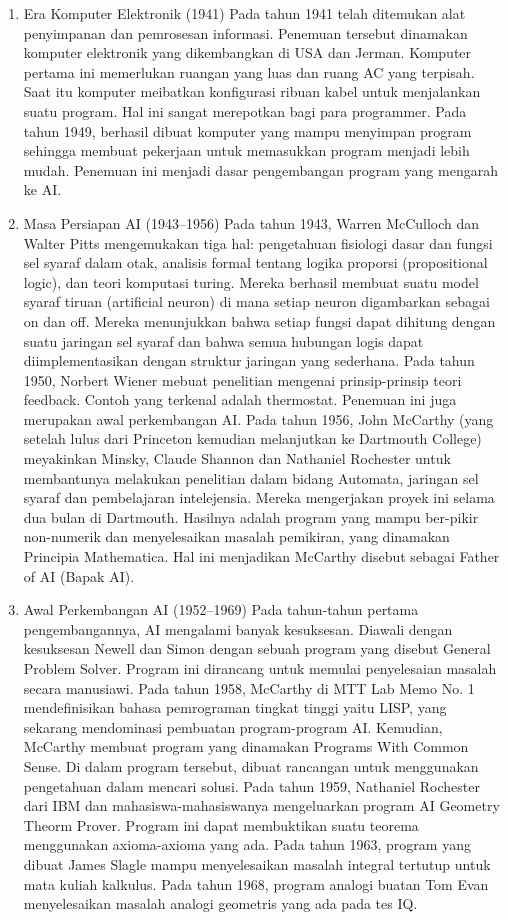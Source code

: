 \documentclass{article}
\begin{document}
\begin{enumerate}
	\item Era Komputer Elektronik (1941)
	\hfill\break
	Pada tahun 1941 telah ditemukan alat penyimpanan dan pemrosesan informasi. Penemuan tersebut dinamakan komputer elektronik yang dikembangkan di USA dan Jerman. Komputer pertama ini memerlukan ruangan yang luas dan ruang AC yang terpisah. Saat itu komputer meibatkan konfigurasi ribuan kabel untuk menjalankan suatu program. Hal ini sangat merepotkan bagi para programmer. Pada tahun 1949, berhasil dibuat komputer yang mampu menyimpan program sehingga membuat pekerjaan untuk memasukkan program menjadi lebih mudah. Penemuan ini menjadi dasar pengembangan program yang mengarah ke AI.

	\item Masa Persiapan AI (1943–1956)
	\hfill\break
	Pada tahun 1943, Warren McCulloch dan Walter Pitts mengemukakan tiga hal: pengetahuan fisiologi dasar dan fungsi sel syaraf dalam otak, analisis formal tentang logika proporsi (propositional logic), dan teori komputasi turing. Mereka berhasil membuat suatu model syaraf tiruan (artificial neuron) di mana setiap neuron digambarkan sebagai on dan off. Mereka menunjukkan bahwa setiap fungsi dapat dihitung dengan suatu jaringan sel syaraf dan bahwa semua hubungan logis dapat diimplementasikan dengan struktur jaringan yang sederhana.
	\noindent
	Pada tahun 1950, Norbert Wiener mebuat penelitian mengenai prinsip-prinsip teori feedback. Contoh yang terkenal adalah thermostat. Penemuan ini juga merupakan awal perkembangan AI. Pada tahun 1956, John McCarthy (yang setelah lulus dari Princeton kemudian melanjutkan ke Dartmouth College) meyakinkan Minsky, Claude Shannon dan Nathaniel Rochester untuk membantunya melakukan penelitian dalam bidang Automata, jaringan sel syaraf dan pembelajaran intelejensia. Mereka mengerjakan proyek ini selama dua bulan di Dartmouth. Hasilnya adalah program yang mampu ber-pikir non-numerik dan menyelesaikan masalah pemikiran, yang dinamakan Principia Mathematica. Hal ini menjadikan McCarthy disebut sebagai Father of AI (Bapak AI).

	\item Awal Perkembangan AI (1952–1969)
	\hfill\break
	Pada tahun-tahun pertama pengembangannya, AI mengalami banyak kesuksesan. Diawali dengan kesuksesan Newell dan Simon dengan sebuah program yang disebut General Problem Solver. Program ini dirancang untuk memulai penyelesaian masalah secara manusiawi. Pada tahun 1958, McCarthy di MTT Lab Memo No. 1 mendefinisikan bahasa pemrograman tingkat tinggi yaitu LISP, yang sekarang mendominasi pembuatan program-program AI. Kemudian, McCarthy membuat program yang dinamakan Programs With Common Sense. Di dalam program tersebut, dibuat rancangan untuk menggunakan pengetahuan dalam mencari solusi. Pada tahun 1959, Nathaniel Rochester dari IBM dan mahasiswa-mahasiswanya mengeluarkan program AI Geometry Theorm Prover. Program ini dapat membuktikan suatu teorema menggunakan axioma-axioma yang ada. Pada tahun 1963, program yang dibuat James Slagle mampu menyelesaikan masalah integral tertutup untuk mata kuliah kalkulus. Pada tahun 1968, program analogi buatan Tom Evan menyelesaikan masalah analogi geometris yang ada pada tes IQ.


\end{enumerate}
\end{document}
